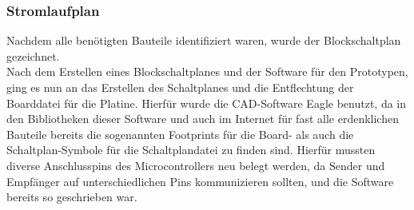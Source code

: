 \subsubsection{Stromlaufplan}
Nachdem alle benötigten Bauteile identifiziert waren, wurde der Blockschaltplan gezeichnet.\\ 
Nach dem Erstellen eines Blockschaltplanes und der Software für den Prototypen, ging es nun an das Erstellen des Schaltplanes und die Entflechtung der Boarddatei für die Platine. Hierfür wurde die CAD-Software Eagle benutzt, da in den Bibliotheken dieser Software und auch im Internet für fast alle erdenklichen Bauteile bereits die sogenannten Footprints für die Board- als auch die Schaltplan-Symbole für die Schaltplandatei zu finden sind. Hierfür mussten diverse Anschlusspins des Microcontrollers neu belegt werden, da Sender und Empfänger auf unterschiedlichen Pins kommunizieren sollten, und die Software bereits so geschrieben war. 
